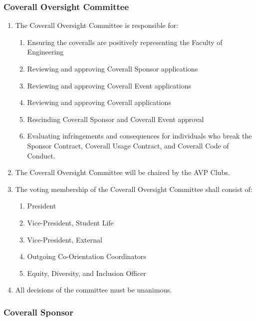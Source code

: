 \subsubsection{Coverall Oversight Committee}
\label{coverall-oversight-committee}

\begin{enumerate}
 \item
  The Coverall Oversight Committee is responsible for:

  \begin{enumerate}
   \item
    Ensuring the coveralls are positively representing the Faculty of
    Engineering
   \item
    Reviewing and approving Coverall Sponsor applications
   \item
    Reviewing and approving Coverall Event applications
   \item
    Reviewing and approving Coverall applications
   \item
    Rescinding Coverall Sponsor and Coverall Event approval
   \item
    Evaluating infringements and consequences for individuals who break
    the Sponsor Contract, Coverall Usage Contract, and Coverall Code of
    Conduct.
  \end{enumerate}
 \item
  The Coverall Oversight Committee will be chaired by the AVP Clubs.
 \item
  The voting membership of the Coverall Oversight Committee shall
  consist of:

  \begin{enumerate}
   \item
    President
   \item
    Vice-President, Student Life
   \item
    Vice-President, External
   \item
    Outgoing Co-Orientation Coordinators
   \item
    Equity, Diversity, and Inclusion Officer
  \end{enumerate}
 \item
  All decisions of the committee must be unanimous.
\end{enumerate}

\subsubsection{Coverall Sponsor}
\label{coverall-sponsor}


